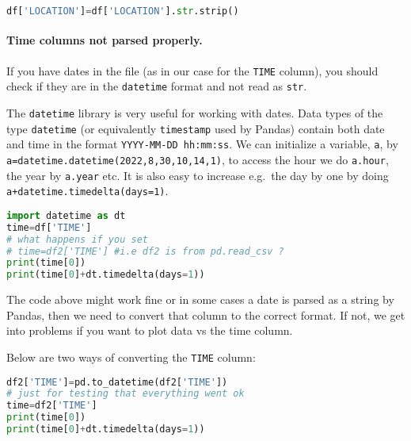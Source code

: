 \documentclass[graybox,sectrefs,envcountresetchap,open=right,final]{svmonodo}
\newenvironment{graybox2admon}[1][]{
\begin{graybox2mdframed}[frametitle=#1]
}
{
\end{graybox2mdframed}
}
\begin{document}
\begin{lstlisting}[language=python,style=blue1bar]
df['LOCATION']=df['LOCATION'].str.strip()

\end{lstlisting}


\paragraph{Time columns not parsed properly.}
If you have dates in the file (as in our case for the \texttt{TIME} column), you should check if they are in the \texttt{datetime} format and not read as \texttt{str}.



\begin{graybox2admon}[\texttt{datetime}]
The \texttt{datetime} library is very useful for working with dates. Data types of the type \texttt{datetime} (or equivalently \texttt{timestamp} used by Pandas) contain both date and time in the format \texttt{YYYY-MM-DD hh:mm:ss}. We can initialize a variable, \texttt{a}, by \texttt{a=datetime.datetime(2022,8,30,10,14,1)}, to access the hour we do \texttt{a.hour}, the year by \texttt{a.year} etc. It is also easy to increase e.g.~the day by one by doing \texttt{a+datetime.timedelta(days=1)}.
\end{graybox2admon}











\begin{lstlisting}[language=python,style=blue1bar]
import datetime as dt
time=df['TIME']
# what happens if you set
# time=df2['TIME'] #i.e df2 is from pd.read_csv ?
print(time[0])
print(time[0]+dt.timedelta(days=1))

\end{lstlisting}


The code above might work fine or in some cases a date is parsed as a string by Pandas, then we need to convert that column to the correct format. If not, we get into problems if you want to plot data vs the time column.

Below are two ways of converting the \texttt{TIME} column:






\begin{lstlisting}[language=python,style=blue1bar]
df2['TIME']=pd.to_datetime(df2['TIME'])
# just for testing that everything went ok
time=df2['TIME']
print(time[0])
print(time[0]+dt.timedelta(days=1))

\end{lstlisting}
\end{document}
